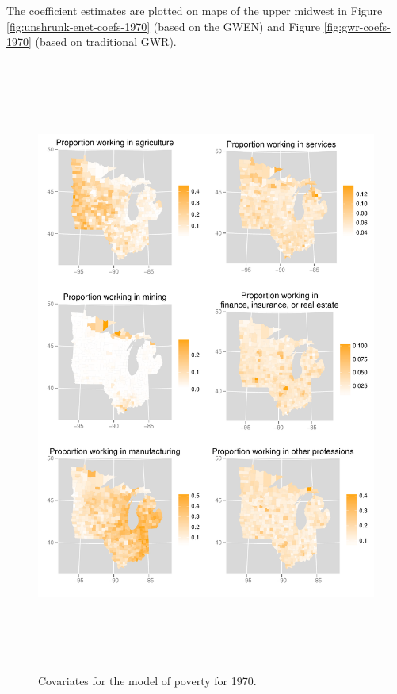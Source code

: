 \documentclass[authoryear, review, 11pt]{elsarticle}
\begin{document}
	
	The coefficient estimates are plotted on maps of the upper midwest in Figure \ref{fig:unshrunk-enet-coefs-1970} (based on the GWEN) and Figure \ref{fig:gwr-coefs-1970} (based on traditional GWR).
	\begin{figure}
		\begin{center}
			\includegraphics[height=8in]{../../figures/poverty/1970-covariates}
			\caption{Covariates for the model of poverty for 1970. \label{fig:1970-covariates}}
		\end{center}
	\end{figure}
\end{document}

